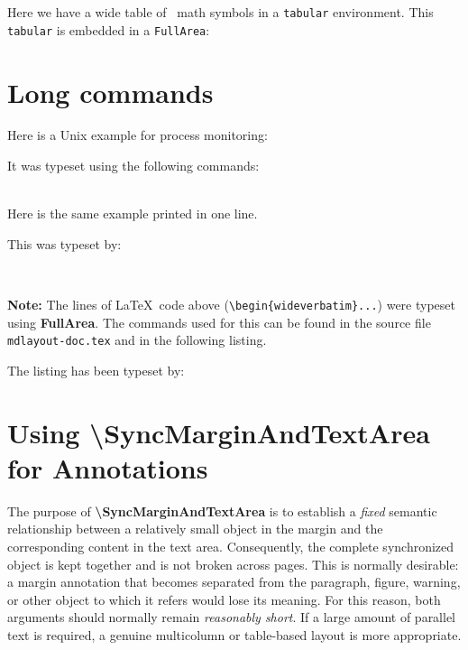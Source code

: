 \documentclass[
11pt,
a4paper,
oneside
]{scrbook}
\newcommand{\latex}[1]{\texttt{\detokenize{#1}}}
\begin{document}
\begin{FullArea}
	Here we have a wide table of \LaTeXe\ math symbols in a \texttt{tabular} environment. This \texttt{tabular} is embedded in a \texttt{FullArea}:\\[2ex]
\begin{footnotesize}
\end{footnotesize}
\end{FullArea}

\section{Long commands}
Here is a Unix example for process monitoring:




It was typeset using the following commands:\\[1ex]
\latex{\begin{verbatim}}




\noindent\latex{\end{verbatim}}\\[1ex]
Here is the same example printed in one line.




This was typeset by:
\begin{FullArea}
\latex{\begin{wideverbatim}}




\noindent\latex{\end{wideverbatim}}\\[1ex]
\end{FullArea}
\noindent \textbf{Note:} The lines of \LaTeX\ code above (\verb|\begin{wideverbatim}...|) were typeset using \textbf{FullArea}. The commands used for this can be found in the source file \texttt{mdlayout-doc.tex} and in the following listing.




The listing has been typeset by:





\section{Using \textbackslash SyncMarginAndTextArea for Annotations}

The purpose of \textbf{\textbackslash SyncMarginAndTextArea} is to establish a \emph{fixed} semantic relationship
between a relatively small object in the margin and the corresponding
content in the text area.
Consequently, the complete synchronized object is kept together and is
not broken across pages. This is normally desirable: a margin annotation
that becomes separated from the paragraph, figure, warning, or other
object to which it refers would lose its meaning.
For this reason, both arguments should normally remain \emph{reasonably short}.
If a large amount of parallel text is required, a genuine multicolumn or
table-based layout is more appropriate.
\end{document}
